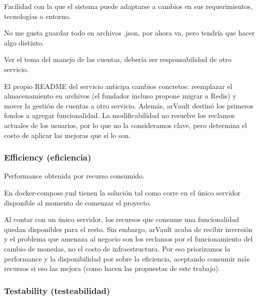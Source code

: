             Facilidad con la que el sistema puede adaptarse a cambios en sus requerimientos, tecnologías o entorno.

            \begin{customenv}[frametitle=]
                No me gusta guardar todo en archivos .json, por ahora va, pero tendría que hacer algo distinto.
            \end{customenv}

            \begin{customenv}[frametitle=]
                Ver el tema del manejo de las cuentas, debería ser responsabilidad de otro servicio.
            \end{customenv}

            El propio README del servicio anticipa cambios concretos: reemplazar el
            almacenamiento en archivos (el fundador incluso propone migrar a Redis) y
            mover la gestión de cuentas a otro servicio. Además, arVault destinó
            los primeros fondos a agregar funcionalidad. La modificabilidad no
            resuelve los reclamos actuales de los usuarios, por lo que no la consideramos
            clave, pero determina el costo de aplicar las mejoras que sí lo son.

        \subsubsection{Efficiency (eficiencia)}
        \label{sec:eficiencia}

            Performance obtenida por recurso consumido.

            \begin{customenv}[frametitle=]
                En docker-compose.yml tienen la solución tal como corre en el único servidor disponible al momento de comenzar el proyecto.
            \end{customenv}

            Al contar con un único servidor, los recursos que consume una funcionalidad
            quedan disponibles para el resto. Sin embargo, arVault acaba de recibir
            inversión y el problema que amenaza al negocio son los reclamos por el
            funcionamiento del cambio de monedas, no el costo de infraestructura. Por
            eso priorizamos la performance y la disponibilidad por sobre la eficiencia,
            aceptando consumir más recursos si eso las mejora (como hacen las propuestas
            de este trabajo).

        \subsubsection{Testability (testeabilidad)}
        \label{sec:testeabilidad}


